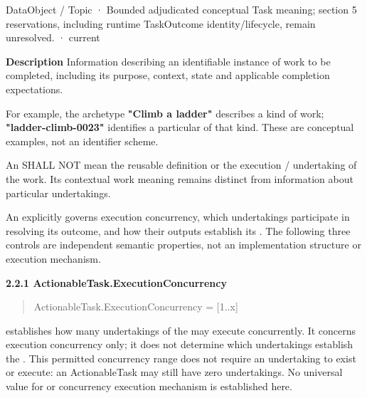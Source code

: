 \label{element:c43139289cb649b4836521a96a51604c}
{\small DataObject / Topic · Bounded adjudicated conceptual Task meaning; section 5 reservations, including runtime TaskOutcome identity/lifecycle, remain unresolved. · current}\par

\textbf{Description}
Information describing an identifiable instance of work to be completed, including its purpose, context, state and applicable completion expectations.



For example, the archetype \textbf{"Climb a ladder"} describes a kind of work;
\textbf{"ladder-climb-0023"} identifies a particular \texttt{} of that kind.
These are conceptual examples, not an identifier scheme.



An \texttt{} SHALL NOT mean the reusable definition or the execution /
undertaking of the work. Its contextual work meaning remains distinct from
information about particular undertakings.



An \texttt{} explicitly governs execution concurrency, which
undertakings participate in resolving its outcome, and how their outputs
establish its \texttt{}. The following three controls are independent
semantic properties, not an implementation structure or execution mechanism.



\par\medskip\textbf{2.2.1 ActionableTask.ExecutionConcurrency}\par


\begin{quote}\small\ttfamily
ActionableTask.ExecutionConcurrency = [1..x]\\

\end{quote}


\texttt{} establishes how many \texttt{} undertakings of
the \texttt{} may execute concurrently. It concerns execution
concurrency only; it does not determine which undertakings establish the
\texttt{}. This permitted concurrency range does not require an
undertaking to exist or execute: an ActionableTask may still have zero
undertakings. No universal value for \texttt{} or concurrency execution mechanism
is established here.



